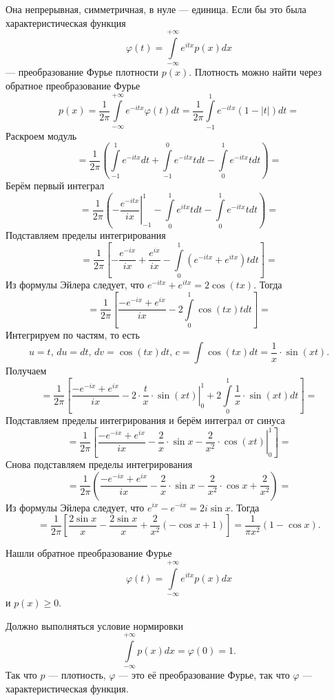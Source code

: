 \begin{enumerate}[label=\alph*)]
  Она непрерывная, симметричная, в нуле --- единица.
  Если бы это была характеристическая функция
  $$ \varphi \left( t \right) =
    \int \limits_{-\infty }^{+\infty } e^{itx} p \left( x \right) dx$$
  --- преобразование Фурье плотности $p \left( x \right) $.
  Плотность можно найти через обратное преобразование Фурье
  $$p \left( x \right) =
    \frac{1}{2 \pi } \int \limits_{-\infty}^{+\infty } e^{-itx} \varphi \left( t \right) dt =
    \frac{1}{2 \pi } \int \limits_{-1}^1 e^{-itx} \left( 1 - \left| t \right| \right) dt =$$
  Раскроем модуль
  $$= \frac{1}{2 \pi } \left(
    \int \limits_{-1}^1 e^{-itx} dt + \int \limits_{-1}^0 e^{-itx} tdt -
    \int \limits_0^1 e^{-itx} tdt \right) =$$
  Берём первый интеграл
  $$= \frac{1}{2 \pi } \left(
    \left. -\frac{e^{-itx}}{ix} \right|_{-1}^1 - \int \limits_0^1 e^{itx} tdt -
    \int \limits_0^1 e^{-itx} tdt \right) =$$
  Подставляем пределы интегрирования
  $$= \frac{1}{2 \pi } \left[
    -\frac{e^{-ix}}{ix} + \frac{e^{ix}}{ix} -
    \int \limits_0^1 \left( e^{-itx} + e^{itx} \right) tdt \right] =$$
  Из формулы Эйлера следует, что $e^{-itx} + e^{itx} = 2 \cos \left( tx \right) $.
  Тогда
  $$= \frac{1}{2 \pi }
    \left[ \frac{-e^{-ix} + e^{ix}}{ix} - 2 \int \limits_0^1 \cos \left( tx \right) tdt \right] =$$
  Интегрируем по частям, то есть
  $$u = t, \,
    du = dt, \,
    dv = \cos \left( tx \right) dt, \,
    c = \int \cos \left( tx \right) dt = \frac{1}{x} \cdot \sin \left( xt \right).$$
  Получаем
  $$= \frac{1}{2 \pi } \left[
      \frac{-e^{-ix} + e^{ix}}{ix} -
      2 \cdot \left. \frac{t}{x} \cdot \sin \left( xt \right) \right|_0^1 +
      2 \int \limits_0^1 \frac{1}{x} \cdot \sin \left( xt \right) dt \right] =$$
  Подставляем пределы интегрирования и берём интеграл от синуса
  $$= \frac{1}{2 \pi } \left[
    \frac{-e^{-ix} + e^{ix}}{ix} - \frac{2}{x} \cdot \sin x -
    \left. \frac{2}{x^2} \cdot \cos \left( xt \right) \right|_0^1 \right] =$$
  Снова подставляем пределы интегрирования
  $$= \frac{1}{2 \pi } \left(
    \frac{-e^{-ix} + e^{ix}}{ix} - \frac{2}{x} \cdot \sin x - \frac{2}{x^2} \cdot \cos x +
    \frac{2}{x^2} \right) =$$
  Из формулы Эйлера следует, что $e^{ix} - e^{-ix} = 2i \sin x$.
  Тогда
  $$= \frac{1}{2 \pi} \left[
    \frac{2 \sin x}{x} - \frac{2 \sin x}{x} + \frac{2}{x^2} \left( -\cos x + 1 \right) \right] =
  \frac{1}{ \pi x^2} \left( 1 - \cos x \right).$$

  Нашли обратное преобразование Фурье
  $$ \varphi \left( t \right) =
    \int \limits_{-\infty }^{+\infty } e^{itx} p \left( x \right) dx $$
  и $p \left( x \right) \geq 0$.

  Должно выполняться условие нормировки
  $$ \int \limits_{-\infty }^{+\infty } p \left( x \right) dx =
    \varphi \left( 0 \right) =
    1.$$
  Так что $p$ --- плотность, $ \varphi $ --- это её преобразование Фурье, так что $ \varphi $ ---
  характеристическая функция.
  \end{enumerate}

